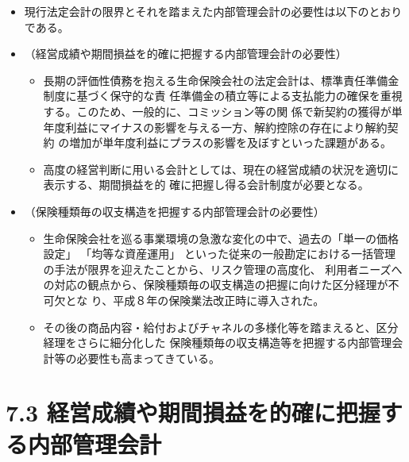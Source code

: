 \documentclass[report,gutter=10mm,fore-edge=10mm,uplatex,dvipdfmx]{jlreq}
\begin{document}
\begin{itemize}
 \item[] 現行法定会計の限界とそれを踏まえた内部管理会計の必要性は以下のとおりである。\\
\item[] （経営成績や期間損益を的確に把握する内部管理会計の必要性）
\begin{itemize}
  \item[] 長期の評価性債務を抱える生命保険会社の法定会計は、標準責任準備金制度に基づく保守的な責
 任準備金の積立等による支払能力の確保を重視する。このため、一般的に、コミッション等の関
 係で新契約の獲得が単年度利益にマイナスの影響を与える一方、解約控除の存在により解約契約
 の増加が単年度利益にプラスの影響を及ぼすといった課題がある。
 \item[] 高度の経営判断に用いる会計としては、現在の経営成績の状況を適切に表示する、期間損益を的
 確に把握し得る会計制度が必要となる。\\
\end{itemize} 
\item[]（保険種類毎の収支構造を把握する内部管理会計の必要性）
\begin{itemize}
  \item[] 生命保険会社を巡る事業環境の急激な変化の中で、過去の「単一の価格設定」
 「均等な資産運用」
 といった従来の一般勘定における一括管理の手法が限界を迎えたことから、リスク管理の高度化、
 利用者ニーズへの対応の観点から、保険種類毎の収支構造の把握に向けた区分経理が不可欠とな
 り、平成８年の保険業法改正時に導入された。
 \item[] その後の商品内容・給付およびチャネルの多様化等を踏まえると、区分経理をさらに細分化した
 保険種類毎の収支構造等を把握する内部管理会計等の必要性も高まってきている。
\end{itemize}
\end{itemize}
\section{7.3 経営成績や期間損益を的確に把握する内部管理会計}
\end{document}
